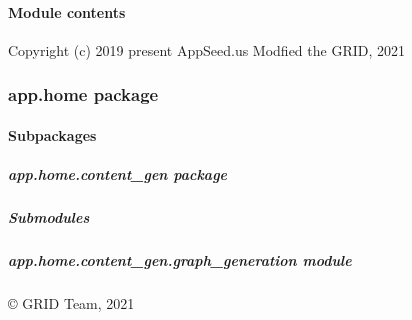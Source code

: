 \documentclass[letterpaper,10pt,french]{sphinxmanual}
\begin{document}
\paragraph{Module contents}
\label{\detokenize{app.base:module-app.base}}\label{\detokenize{app.base:module-contents}}
\sphinxAtStartPar
Copyright (c) 2019 \sphinxhyphen{} present AppSeed.us
Modfied the GRID, 2021


\subsubsection{app.home package}
\label{\detokenize{app.home:app-home-package}}\label{\detokenize{app.home::doc}}

\paragraph{Subpackages}
\label{\detokenize{app.home:subpackages}}

\subparagraph{app.home.content\_gen package}
\label{\detokenize{app.home.content_gen:app-home-content-gen-package}}\label{\detokenize{app.home.content_gen::doc}}

\subparagraph{Submodules}
\label{\detokenize{app.home.content_gen:submodules}}

\subparagraph{app.home.content\_gen.graph\_generation module}
\label{\detokenize{app.home.content_gen:module-app.home.content_gen.graph_generation}}\label{\detokenize{app.home.content_gen:app-home-content-gen-graph-generation-module}}
\sphinxAtStartPar
© GRID Team, 2021
\end{document}

